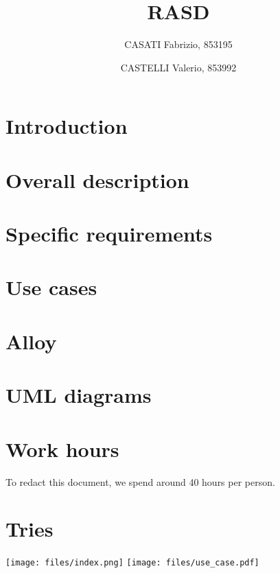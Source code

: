 




\title{RASD}
\author{
	CASATI Fabrizio, 853195
	\and
	CASTELLI Valerio, 853992
}

\maketitle
\tableofcontents

\chapter{Introduction}


\chapter{Overall description}


\chapter{Specific requirements}


\begin{appendices}
\chapter{Use cases}


\chapter{Alloy}


\chapter{UML diagrams}


\chapter{Work hours}
To redact this document, we spend around 40 hours per person.

\chapter{Tries}
\begin{landscape}
    \texttt{[image: files/index.png]}
    \label{fig:PropProf}
	\texttt{[image: files/use\_case.pdf]}
\end{landscape}
    

\label{fig:PropProf}


\end{appendices}


